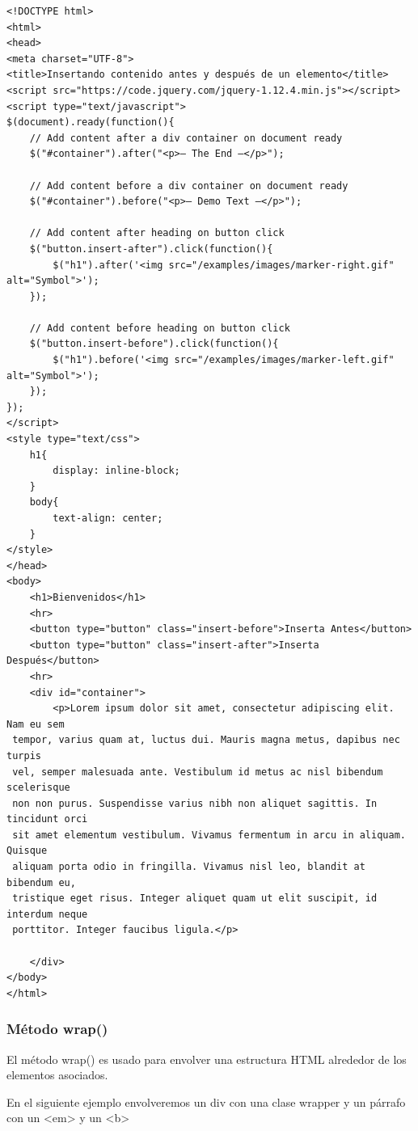 \documentclass[a4paper, oneside]{article}
\begin{document}
\begin{verbatim}
<!DOCTYPE html>
<html>
<head>
<meta charset="UTF-8">
<title>Insertando contenido antes y después de un elemento</title>
<script src="https://code.jquery.com/jquery-1.12.4.min.js"></script>
<script type="text/javascript">
$(document).ready(function(){
    // Add content after a div container on document ready
    $("#container").after("<p>— The End —</p>");

    // Add content before a div container on document ready
    $("#container").before("<p>— Demo Text —</p>");

    // Add content after heading on button click
    $("button.insert-after").click(function(){
        $("h1").after('<img src="/examples/images/marker-right.gif" alt="Symbol">');
    });

    // Add content before heading on button click
    $("button.insert-before").click(function(){
        $("h1").before('<img src="/examples/images/marker-left.gif" alt="Symbol">');
    });
});
</script>
<style type="text/css">
    h1{
        display: inline-block; 
    }
    body{
        text-align: center;
    }
</style>
</head>
<body>
    <h1>Bienvenidos</h1>
    <hr>
    <button type="button" class="insert-before">Inserta Antes</button>
    <button type="button" class="insert-after">Inserta Después</button>
    <hr>
    <div id="container">
        <p>Lorem ipsum dolor sit amet, consectetur adipiscing elit. Nam eu sem
 tempor, varius quam at, luctus dui. Mauris magna metus, dapibus nec turpis
 vel, semper malesuada ante. Vestibulum id metus ac nisl bibendum scelerisque
 non non purus. Suspendisse varius nibh non aliquet sagittis. In tincidunt orci
 sit amet elementum vestibulum. Vivamus fermentum in arcu in aliquam. Quisque
 aliquam porta odio in fringilla. Vivamus nisl leo, blandit at bibendum eu,
 tristique eget risus. Integer aliquet quam ut elit suscipit, id interdum neque
 porttitor. Integer faucibus ligula.</p>

    </div>
</body>
</html>   
\end{verbatim}

\subsubsection{Método wrap()}
\label{sec:org1b43637}

El método wrap() es usado para envolver una estructura HTML alrededor de los elementos asociados. 

En el siguiente ejemplo envolveremos un div con una clase wrapper y un párrafo con un <em> y un <b>
\end{document}
